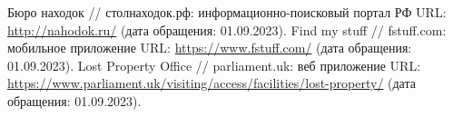 \documentclass{mirea}
\begin{document}
	
% 
	
\addtocounter{page}{2}

\tableofcontents















\begin{thebibliography}{99\kern\bibindent}
	 Бюро находок // столнаходок.рф: информационно-поисковый портал РФ URL: \url{http://nahodok.ru/} (дата обращения: 01.09.2023).
	 Find my stuff // fstuff.com: мобильное приложение URL: \url{https://www.fstuff.com/} (дата обращения: 01.09.2023).
	 Lost Property Office // parliament.uk: веб приложение URL: \url{https://www.parliament.uk/visiting/access/facilities/lost-property/} (дата обращения: 01.09.2023).
\end{thebibliography}



\appendix



	
\end{document}

